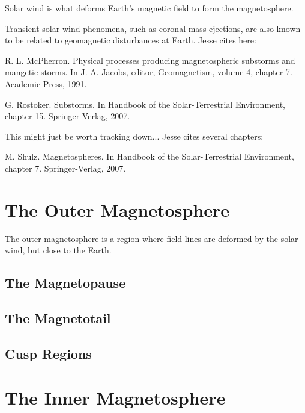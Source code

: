 Solar wind is what deforms Earth's magnetic field to form the magnetosphere. 

Transient solar wind phenomena, such as coronal mass ejections, are also known to be related to geomagnetic disturbances at Earth. Jesse cites here: 

R. L. McPherron. Physical processes producing magnetospheric substorms and mangetic storms. In J. A. Jacobs, editor, Geomagnetism, volume 4, chapter 7. Academic Press, 1991.

G. Rostoker. Substorms. In Handbook of the Solar-Terrestrial Environment, chapter 15. Springer-Verlag, 2007.

This might just be worth tracking down... Jesse cites several chapters: 

M. Shulz. Magnetospheres. In Handbook of the Solar-Terrestrial Environment, chapter 7. Springer-Verlag, 2007.




\section{The Outer Magnetosphere}

The outer magnetosphere is a region where field lines are deformed by the solar wind, but close to the Earth. 

\subsection{The Magnetopause}

\subsection{The Magnetotail}

\subsection{Cusp Regions}

\section{The Inner Magnetosphere}

